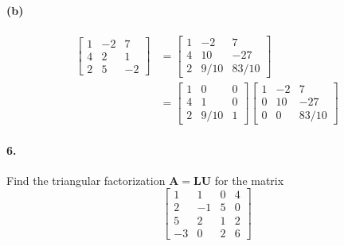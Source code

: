 \documentclass{article}  %
\begin{document}
        \paragraph{(b)}
            \begin{align*}
            \left[                 %
              \begin{array}{rrr}   %
                1 & -2 & 7 \\
                4 & 2 & 1 \\
                2 & 5 & -2 
              \end{array}
            \right]  &\bm=               %
            \left[                 %
              \begin{array}{rrr}   %
                1 & -2 & 7 \\
                4 & 10 & -27 \\
                2 & 9/10 & 83/10
              \end{array}
            \right] \\ &\bm=
            \left[                 %
              \begin{array}{rrr}   %
                1 & 0 & 0 \\
                4 & 1 & 0 \\
                2 & 9/10 & 1
              \end{array}
            \right]
            \left[                 %
              \begin{array}{rrr}   %
                1 & -2 & 7 \\
                0 & 10 & -27 \\
                0 & 0 & 83/10
              \end{array}
            \right]
        \end{align*}
        \paragraph{6.}Find the triangular factorization $\bm{A = LU}$ for the matrix
        \begin{equation*}       %
            \left[                 %
              \begin{array}{rrrr}   %
                1 & 1 & 0 & 4 \\
                2 & -1 & 5 & 0 \\
                5 & 2 & 1 & 2 \\
                -3 & 0 & 2 & 6
              \end{array}
            \right]                 %
        \end{equation*}
\end{document}
